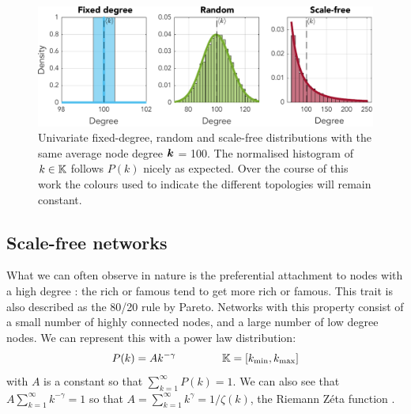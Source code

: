 \begin{figure}[H]
\centering
\includegraphics[width = \textwidth]{../Figures/Distributions/1D.pdf}
\caption{Univariate fixed-degree, random and scale-free distributions with the same average node degree ${\boldsymbol{k}}$ = 100. The normalised histogram of $k \in {\mathbb{K}}$ follows $P(k)$ nicely as expected. Over the course of this work the colours used to indicate the different topologies will remain constant.}
\label{fig:1Dpdfs}
\end{figure}


\subsection{Scale-free networks}
What we can often observe in nature is the preferential attachment to nodes with a high degree \cite{Bullmore2010}: the rich or famous tend to get more rich or famous. This trait is also described as the 80/20 rule by Pareto. Networks with this property consist of a small number of highly connected nodes, and a large number of low degree nodes. We can represent this with a power law distribution:
\begin{align}
P(k) = A k^{-\gamma} \hspace{15mm} \K = [\kmin, \kmax] \label{eq:scalefreepdf}
\end{align}
with $A$ is a constant so that $\sum_{k=1}^{\infty} P(k) = 1$. We can also see that $A \sum_{k=1}^{\infty} k^{-\gamma} = 1$ so that $A = \sum_{k=1}^{\infty} k^{\gamma} = 1/\zeta(k)$, the Riemann Z{\'e}ta function \cite{BarabasiNetworkBook2016}. 

